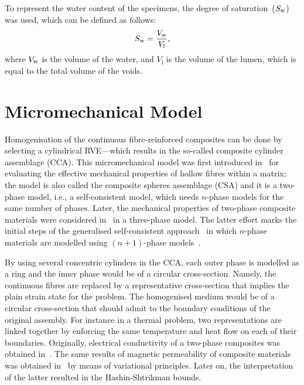 	To represent the water content of the specimens, the degree of saturation~($S_{\text w}$) was used, which can be defined as follows:
\begin{equation}
S_{\text w}=\frac{V_{\text w}}{V_{\text{l}}},
\end{equation}
	where $V_{\text w}$ is the volume of the water, and $V_{\text{l}}$ is the volume of the lumen, which is equal to the total volume of the voids.
	




\red
\section{Micromechanical Model}
	Homogenisation of the continuous fibre-reinforced composites can be done by selecting a cylindrical RVE---which results in the so-called composite cylinder assemblage (CCA). This micromechanical model was first introduced in~\parencite{Hashin.1964} for evaluating the effective mechanical properties of hollow fibres within a matrix; the model is also called the composite spheres assemblage (CSA) and it is a two-phase model, i.e., a self-consistent model, which needs $n$-phase models for the same number of phases. Later, the mechanical properties of two-phase composite materials were considered in~\parencite{Christensen.1979} in a three-phase model. The latter effort marks the initial steps of the generalised self-consistent approach~\parencite{Bohm.2020} in which $n$-phase materials are modelled using $(n+1)$-phase models~\parencite{Herve.1993}. 
	
	By using several concentric cylinders in the CCA, each outer phase is modelled as a ring and the inner phase would be of a circular cross-section. Namely, the continuous fibres are replaced by a representative cross-section that implies the plain strain state for the problem. The homogenised medium would be of a circular cross-section that should admit to the boundary conditions of the original assembly. For instance in a thermal problem, two representations are linked together by enforcing the same temperature and heat flow on each of their boundaries. Originally, electrical conductivity of a two-phase composites was obtained in~\autocite{Kerner.1956b}. The same results of magnetic permeability of composite materials was obtained in~\autocite{Hashin.1962b} by means of variational principles. Later on, the interpretation of the latter resulted in the Hashin-Shtrikman bounds. 
	

